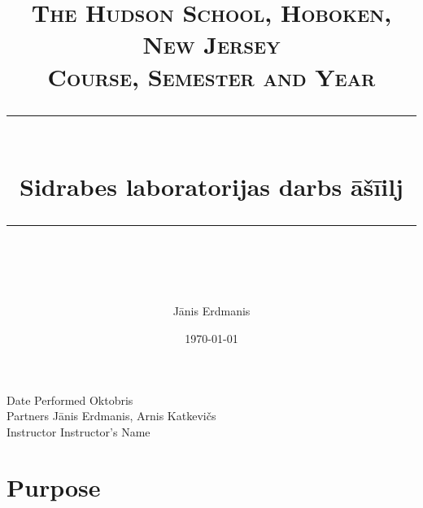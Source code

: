 \documentclass[a4paper]{article} %
\title{
\normalfont \normalsize 
\textsc{The Hudson School, Hoboken, New Jersey \\ 
Course, Semester and Year} \\
[10pt] 
\rule{\linewidth}{0.5pt} \\[6pt] 
\huge Sidrabes laboratorijas darbs āšīilj \\
\rule{\linewidth}{2pt}  \\[10pt]
}
\author{Jānis Erdmanis}
\date{\normalsize \today}
\begin{document}
\maketitle
\noindent
Date Performed \dotfill Oktobris \\
Partners \dotfill Jānis Erdmanis, Arnis Katkevičs \\
Instructor \dotfill Instructor's Name \\



%
%
%
%





\section{Purpose}
 








\end{document}
